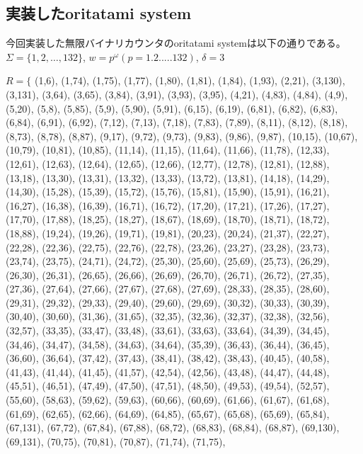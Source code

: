 \documentclass[a4j,11pt]{article}
\begin{document}
\subsection{実装したoritatami system}
今回実装した無限バイナリカウンタのoritatami systemは以下の通りである。
$\Sigma = \{ 1,2, \ldots , 132\}$, $w = p^\omega (p= 1.2.....132)$, $\delta = 3$\\
\raggedright
$R = \{$
(1,6),
(1,74),
(1,75),
(1,77),
(1,80),
(1,81),
(1,84),
(1,93),
(2,21),
(3,130),
(3,131),
(3,64),
(3,65),
(3,84),
(3,91),
(3,93),
(3,95),
(4,21),
(4,83),
(4,84),
(4,9),
(5,20),
(5,8),
(5,85),
(5,9),
(5,90),
(5,91),
(6,15),
(6,19),
(6,81),
(6,82),
(6,83),
(6,84),
(6,91),
(6,92),
(7,12),
(7,13),
(7,18),
(7,83),
(7,89),
(8,11),
(8,12),
(8,18),
(8,73),
(8,78),
(8,87),
(9,17),
(9,72),
(9,73),
(9,83),
(9,86),
(9,87),
(10,15),
(10,67),
(10,79),
(10,81),
(10,85),
(11,14),
(11,15),
(11,64),
(11,66),
(11,78),
(12,33),
(12,61),
(12,63),
(12,64),
(12,65),
(12,66),
(12,77),
(12,78),
(12,81),
(12,88),
(13,18),
(13,30),
(13,31),
(13,32),
(13,33),
(13,72),
(13,81),
(14,18),
(14,29),
(14,30),
(15,28),
(15,39),
(15,72),
(15,76),
(15,81),
(15,90),
(15,91),
(16,21),
(16,27),
(16,38),
(16,39),
(16,71),
(16,72),
(17,20),
(17,21),
(17,26),
(17,27),
(17,70),
(17,88),
(18,25),
(18,27),
(18,67),
(18,69),
(18,70),
(18,71),
(18,72),
(18,88),
(19,24),
(19,26),
(19,71),
(19,81),
(20,23),
(20,24),
(21,37),
(22,27),
(22,28),
(22,36),
(22,75),
(22,76),
(22,78),
(23,26),
(23,27),
(23,28),
(23,73),
(23,74),
(23,75),
(24,71),
(24,72),
(25,30),
(25,60),
(25,69),
(25,73),
(26,29),
(26,30),
(26,31),
(26,65),
(26,66),
(26,69),
(26,70),
(26,71),
(26,72),
(27,35),
(27,36),
(27,64),
(27,66),
(27,67),
(27,68),
(27,69),
(28,33),
(28,35),
(28,60),
(29,31),
(29,32),
(29,33),
(29,40),
(29,60),
(29,69),
(30,32),
(30,33),
(30,39),
(30,40),
(30,60),
(31,36),
(31,65),
(32,35),
(32,36),
(32,37),
(32,38),
(32,56),
(32,57),
(33,35),
(33,47),
(33,48),
(33,61),
(33,63),
(33,64),
(34,39),
(34,45),
(34,46),
(34,47),
(34,58),
(34,63),
(34,64),
(35,39),
(36,43),
(36,44),
(36,45),
(36,60),
(36,64),
(37,42),
(37,43),
(38,41),
(38,42),
(38,43),
(40,45),
(40,58),
(41,43),
(41,44),
(41,45),
(41,57),
(42,54),
(42,56),
(43,48),
(44,47),
(44,48),
(45,51),
(46,51),
(47,49),
(47,50),
(47,51),
(48,50),
(49,53),
(49,54),
(52,57),
(55,60),
(58,63),
(59,62),
(59,63),
(60,66),
(60,69),
(61,66),
(61,67),
(61,68),
(61,69),
(62,65),
(62,66),
(64,69),
(64,85),
(65,67),
(65,68),
(65,69),
(65,84),
(67,131),
(67,72),
(67,84),
(67,88),
(68,72),
(68,83),
(68,84),
(68,87),
(69,130),
(69,131),
(70,75),
(70,81),
(70,87),
(71,74),
(71,75),
\end{document}
